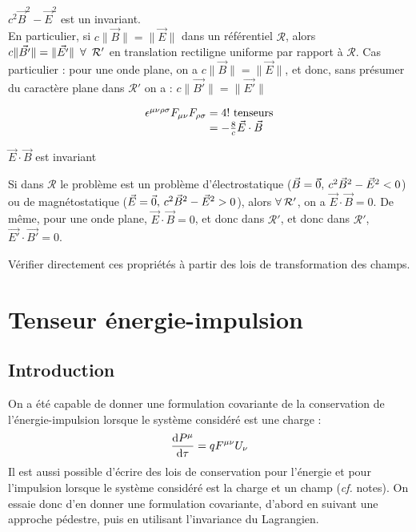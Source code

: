 \begin{conc}
	$c^2\vec{B}^2-\vec{E}^2$ est un invariant.\\
	En particulier, si $c\|\vec{B}\|=\|\vec{E}\|$ dans un référentiel $\mathcal{R}$, alors $c\|\vec{B'}\|=\|\vec{E'}\| \kern 5pt \forall \kern 5pt \mathcal{R'}$ en translation rectiligne uniforme par rapport à $\mathcal{R}$. Cas particulier : pour une onde plane, on a $c\|\vec{B}\|=\|\vec{E}\|$, et donc, sans présumer du caractère plane dans $\mathcal{R'}$ on a : $c\|\vec{B'}\|=\|\vec{E'}\|$
\end{conc}
$$
	\begin{array}{r@{\;}l}
		\epsilon^{\mu\nu\rho\sigma}F_{\mu\nu}F_{\rho\sigma} &= 4!\text{ tenseurs}\\
			&=-\frac{8}{c}\vec{E}\cdot\vec{B}
	\end{array}
$$
\begin{conc}
	$\vec{E}\cdot\vec{B}$ est invariant
\end{conc}
\begin{app}
	Si dans $\mathcal{R}$ le problème est un problème d'électrostatique ($\vec{B}=\vec{0}, \kern 2pt c^2\vec{B}^2-\vec{E}^2<0$) ou de magnétostatique ($\vec{E}=\vec{0}, \kern 2pt c^2\vec{B}^2-\vec{E}^2>0$), alors $\forall \kern 2pt \mathcal{R'}$, on a $\vec{E}\cdot\vec{B}=0$. De m\^eme, pour une onde plane, $\vec{E}\cdot\vec{B}=0$, et donc dans $\mathcal{R'}$, et donc dans $\mathcal{R'}$, $\vec{E'}\cdot\vec{B'}=0$.
\end{app}
\begin{exo}
	Vérifier directement ces propriétés à partir des lois de transformation des champs.
\end{exo}

\section{Tenseur énergie-impulsion}
\subsection{Introduction}
On a été capable de donner une formulation covariante de la conservation de l'énergie-impulsion lorsque le système considéré est une charge :
$$
	\frac{\mathrm{d} P^\mu}{\mathrm{d}\tau}=qF^{\mu\nu}U_\nu
$$
Il est aussi possible d'écrire des lois de conservation pour l'énergie et pour l'impulsion lorsque le système considéré est la charge et un champ (\emph{cf.} notes). On essaie donc d'en donner une formulation covariante, d'abord en suivant une approche pédestre, puis en utilisant l'invariance du Lagrangien.

